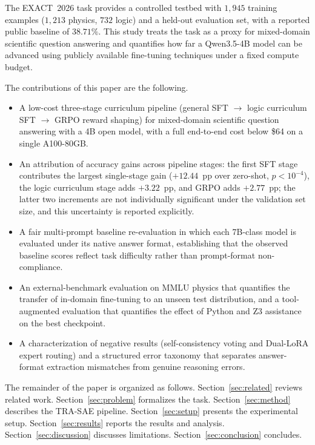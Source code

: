 \documentclass[preprint,12pt]{elsarticle}
\newcommand{\modelname}{\textsc{TRA-SAE}}
\newcommand{\basemodelname}{Qwen3.5-4B}
\newcommand{\dataset}{EXACT~2026}
\begin{document}
The \dataset{} task provides a controlled testbed with $1{,}945$ training
examples ($1{,}213$ physics, $732$ logic) and a held-out evaluation set,
with a reported public baseline of $38.71\%$. This study treats the task
as a proxy for mixed-domain scientific question answering and quantifies
how far a \basemodelname{} model can be advanced using publicly available
fine-tuning techniques under a fixed compute budget.

The contributions of this paper are the following.
\begin{itemize}
  \item A low-cost three-stage curriculum pipeline (general SFT
        $\rightarrow$ logic curriculum SFT $\rightarrow$ GRPO reward
        shaping) for mixed-domain scientific question answering with a 4B
        open model, with a full end-to-end cost below \$64 on a single
        A100-80GB.
  \item An attribution of accuracy gains across pipeline stages: the first
        SFT stage contributes the largest single-stage gain
        ($+12.44$~pp over zero-shot, $p<10^{-4}$), the logic curriculum
        stage adds $+3.22$~pp, and GRPO adds $+2.77$~pp; the latter two
        increments are not individually significant under the validation
        set size, and this uncertainty is reported explicitly.
  \item A fair multi-prompt baseline re-evaluation in which each 7B-class
        model is evaluated under its native answer format, establishing
        that the observed baseline scores reflect task difficulty rather
        than prompt-format non-compliance.
  \item An external-benchmark evaluation on MMLU physics that quantifies
        the transfer of in-domain fine-tuning to an unseen test
        distribution, and a tool-augmented evaluation that quantifies the
        effect of Python and Z3 assistance on the best checkpoint.
  \item A characterization of negative results (self-consistency voting and
        Dual-LoRA expert routing) and a structured error taxonomy that
        separates answer-format extraction mismatches from genuine
        reasoning errors.
\end{itemize}

The remainder of the paper is organized as follows.
Section~\ref{sec:related} reviews related work.
Section~\ref{sec:problem} formalizes the task.
Section~\ref{sec:method} describes the \modelname{} pipeline.
Section~\ref{sec:setup} presents the experimental setup.
Section~\ref{sec:results} reports the results and analysis.
Section~\ref{sec:discussion} discusses limitations.
Section~\ref{sec:conclusion} concludes.
\end{document}

